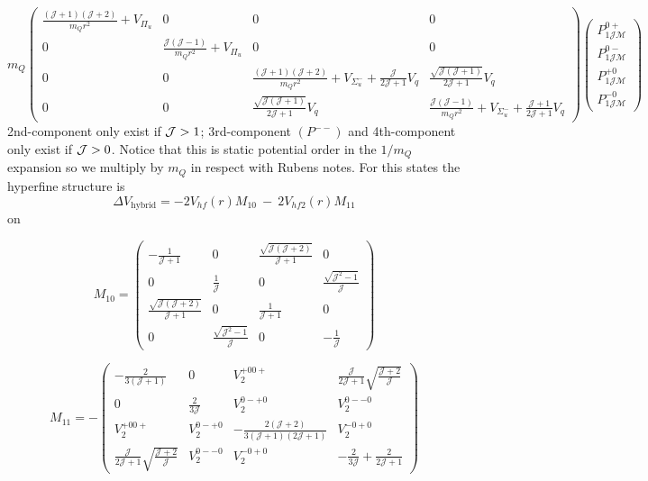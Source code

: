\documentclass[11pt, a4paper]{article}
\begin{document}
\begin{equation} \label{Mhf2}
m_Q\begin{pmatrix}
 \frac{(\mathcal{J}+1)(\mathcal{J}+2)}{m_Q r^2} + V_{\Pi_u} & 0 & 0 & 0 \\
0 &\frac{\mathcal{J}(\mathcal{J}-1)}{m_Q r^2} + V_{\Pi_u} & 0 & 0  \\
0 & 0 & \frac{(\mathcal{J}+1)(\mathcal{J}+2)}{m_Q r^2} + V_{\Sigma_u^-} + \frac{\mathcal{J}}{2\mathcal{J}+1}V_q   & \frac{\sqrt{\mathcal{J}(\mathcal{J}+1)}}{2\mathcal{J}+1}V_q  \\
0 & 0 & \frac{\sqrt{\mathcal{J}(\mathcal{J}+1)}}{2\mathcal{J}+1}V_q & \frac{\mathcal{J}(\mathcal{J}-1)}{m_Q r^2} + V_{\Sigma_u^-} + \frac{\mathcal{J}+1}{2\mathcal{J}+1}V_q
\end{pmatrix}
\begin{pmatrix}
    P^{0+}_{1\mathcal{J}\mathcal{M}} \\
    P^{0-}_{1\mathcal{J}\mathcal{M}} \\
    P^{+0}_{1\mathcal{J}\mathcal{M}} \\
    P^{-0}_{1\mathcal{J}\mathcal{M}}
\end{pmatrix}
\end{equation}
2nd-component only exist if ${\cal J}>1$;
3rd-component $(P^{--})$ and 4th-component only exist if ${\cal J}>0$. 
Notice that this is static potential order in the $1/m_Q$ expansion so we multiply by $m_Q$ in respect with Rubens notes.
For this states the hyperfine structure is
$$\Delta V_{\text{hybrid}} =  -2 V_{hf}(r) M_{10} \ - \ 2 V_{hf2}(r) M_{11} $$
on

\begin{equation}\label{eq:M10}
M_{10} = \begin{pmatrix}
-\frac{1}{\mathcal{J}+1} & 0 & \frac{\sqrt{\mathcal{J}(\mathcal{J}+2)}}{\mathcal{J}+1} & 0 \\
0 & \frac{1}{\mathcal{J}} & 0 & \frac{\sqrt{\mathcal{J}^2-1}}{\mathcal{J}} \\
\frac{\sqrt{\mathcal{J}(\mathcal{J}+2)}}{\mathcal{J}+1} & 0 & \frac{1}{\mathcal{J}+1} & 0 \\
0 & \frac{\sqrt{\mathcal{J}^2-1}}{\mathcal{J}} & 0 & -\frac{1}{\mathcal{J}}
\end{pmatrix}
\end{equation}

\begin{equation}\label{eq:M11}
M_{11} = - \begin{pmatrix}
-\frac{2}{3(\mathcal{J}+1)} & 0 & V_2^{+00+} & \frac{\mathcal{J}}{2\mathcal{J}+1}\sqrt{\frac{\mathcal{J}+2}{\mathcal{J}}}  \\
0 & \frac{2}{3\mathcal{J}} & V_2^{0-+0} & V_2^{0--0} \\
%
V_2^{+00+} & V_2^{0-+0} & -\frac{2(\mathcal{J}+2)}{3(\mathcal{J}+1)(2\mathcal{J}+1)} & V_2^{-0+0} \\
%
\frac{\mathcal{J}}{2\mathcal{J}+1}\sqrt{\frac{\mathcal{J}+2}{\mathcal{J}}}  & V_2^{0--0}& V_2^{-0+0} & -\frac{2}{3\mathcal{J}} + \frac{2}{2\mathcal{J}+1}
\end{pmatrix}
\end{equation}
\end{document}
